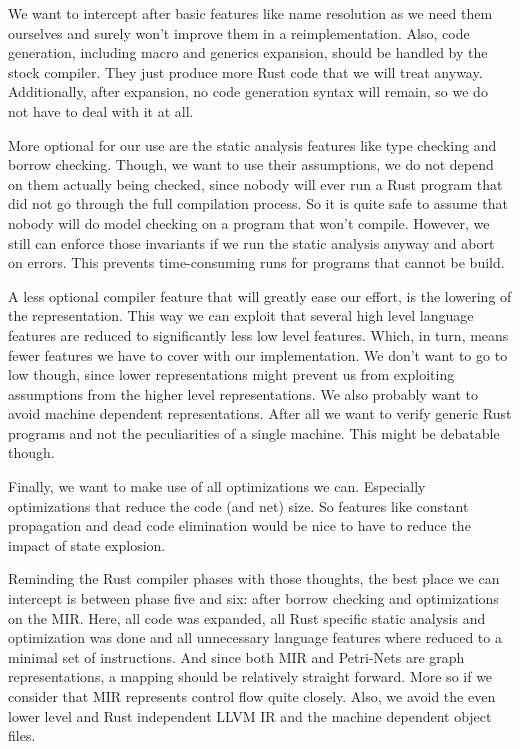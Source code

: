 We want to intercept after basic features like name resolution as we need them ourselves and surely won't improve them in a reimplementation.
Also, code generation, including macro and generics expansion, should be handled by the stock compiler.
They just produce more Rust code that we will treat anyway.
Additionally, after expansion, no code generation syntax will remain, so we do not have to deal with it at all.

More optional for our use are the static analysis features like type checking and borrow checking.
Though, we want to use their assumptions, we do not depend on them actually being checked, since nobody will ever run a Rust program that did not go through the full compilation process.
So it is quite safe to assume that nobody will do model checking on a program that won't compile.
However, we still can enforce those invariants if we run the static analysis anyway and abort on errors.
This prevents time-consuming runs for programs that cannot be build.

A less optional compiler feature that will greatly ease our effort, is the lowering of the representation.
This way we can exploit that several high level language features are reduced to significantly less low level features.
Which, in turn, means fewer features we have to cover with our implementation.
We don't want to go to low though, since lower representations might prevent us from exploiting assumptions from the higher level representations.
We also probably want to avoid machine dependent representations.
After all we want to verify generic Rust programs and not the peculiarities of a single machine.
This might be debatable though.

Finally, we want to make use of all optimizations we can.
Especially optimizations that reduce the code (and net) size.
So features like constant propagation and dead code elimination would be nice to have to reduce the impact of state explosion.

Reminding the Rust compiler phases with those thoughts, the best place we can intercept is between phase five and six:
after borrow checking and optimizations on the MIR.
Here, all code was expanded, all Rust specific static analysis and optimization was done and all unnecessary language features where reduced to a minimal set of instructions.
And since both MIR and Petri-Nets are graph representations, a mapping should be relatively straight forward.
More so if we consider that MIR represents control flow quite closely.
Also, we avoid the even lower level and Rust independent LLVM IR and the machine dependent object files. 

